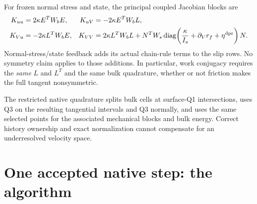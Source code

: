 \documentclass[11pt,a4paper]{article}
\newcommand{\diag}{\operatorname{diag}}
\begin{document}
For frozen normal stress and state, the principal coupled Jacobian blocks are
\begin{align}
 K_{uu}&=2\kappa E^TW_bE,&
 K_{uV}&=-2\kappa E^TW_bL,\\
 K_{Vu}&=-2\kappa L^TW_bE,&
 K_{VV}&=2\kappa L^TW_bL+
 N^TW_s\diag\!\left(\frac\kappa{I_s}
              +\partial_Vr_f+\eta^{\rm dpr}\right)N.
\end{align}
Normal-stress/state feedback adds its actual chain-rule terms to the slip
rows. No symmetry claim applies to those additions. In particular,
work conjugacy requires the \emph{same} $L$ and $L^T$ and the same bulk
quadrature, whether or not friction makes the full tangent nonsymmetric.

The restricted native quadrature splits bulk cells at surface-Q1 intersections,
uses Q3 on the resulting tangential intervals and Q3 normally, and uses the
same selected points for the associated mechanical blocks and bulk energy.
Correct history ownership and exact normalization cannot compensate for an
underresolved velocity space.

\section{One accepted native step: the algorithm}
\label{sec:algorithm}
\end{document}
